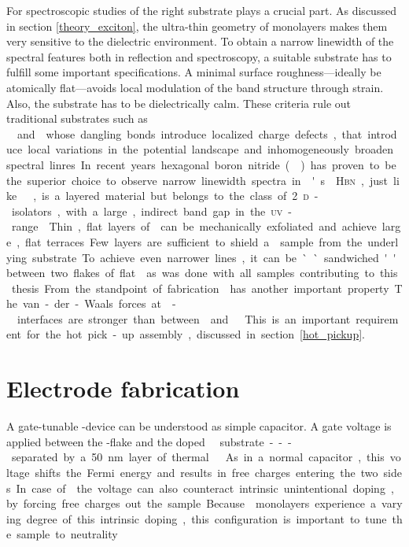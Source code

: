 For spectroscopic studies of \tmds the right substrate plays a crucial part. As discussed in section \ref{theory_exciton}, the ultra-thin geometry of \tmdg monolayers makes them very sensitive to the dielectric environment. To obtain a narrow linewidth of the spectral features both in reflection and \pl spectroscopy, a suitable substrate has to fulfill some important specifications. A minimal surface roughness---ideally be atomically flat---avoids local modulation of the band structure through strain. Also, the substrate has to be dielectrically calm. These criteria rule out traditional substrates such as \si\ and \sio whose dangling bonds introduce localized charge defects, that introduce local variations in the potential landscape and inhomogeneously broaden spectral linres. In recent years hexagonal boron nitride (\hbn) has proven to be the superior choice to observe narrow linewidth spectra in \tmd's\cite{courtade_spectrally_2018}. \textsc{Hbn}, just like \tmds\!, is a layered material but belongs to the class of 2\textsc{d}-isolators, with a large, indirect band gap in the \textsc{uv}-range\cite{arnaud_huge_2006}. Thin, flat layers of \hbng can be mechanically exfoliated and achieve large, flat terraces. Few layers are sufficient to shield a \tmdg sample from the underlying substrate. To achieve even narrower lines, it can be ``sandwiched'' between two flakes of flat \hbng as was done with all samples contributing to this thesis. From the standpoint of fabrication \hbng has another important property. The van-der-Waals forces at \hbn-\tmdg interfaces are stronger than between \tmds and \sio\!. This is an important requirement for the hot pick-up assembly, discussed in section \ref{hot_pickup}.

\section{Electrode fabrication}

A gate-tunable \tmd-device can be understood as simple capacitor. A gate voltage is applied between the \tmd-flake and the doped \si\ substrate---separated by a 50 nm layer of thermal \sio\!. As in a normal capacitor, this voltage shifts the Fermi energy and results in free charges entering the two sides. In case of \tmds the voltage can also counteract intrinsic unintentional doping, by forcing free charges out the sample. Because \tmdg monolayers experience a varying degree of this intrinsic doping, this configuration is important to tune the sample to neutrality

